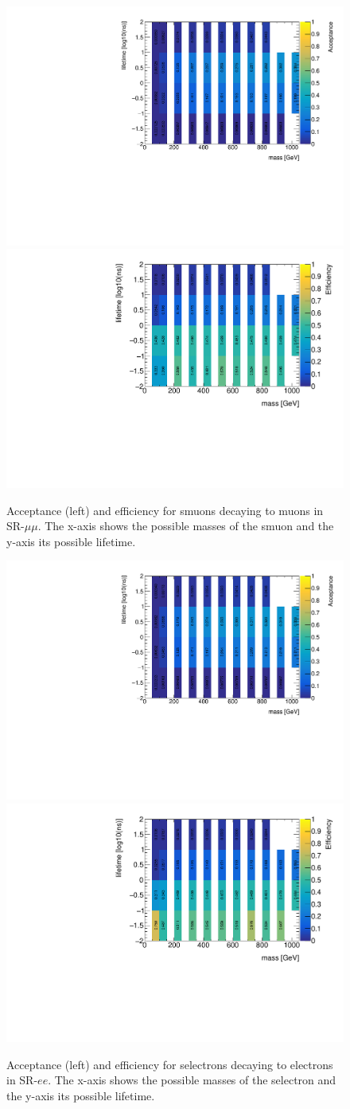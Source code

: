 \begin{figure}[htbp]
\centering
\includegraphics[width=.48\textwidth]{figures/event_selection/mm_slep_acc.pdf}
\includegraphics[width=.48\textwidth]{figures/event_selection/mm_slep_eff.pdf}
\caption{Acceptance (left) and efficiency for smuons decaying to muons in SR-$\mu\mu$. The x-axis shows the possible masses of the smuon and the y-axis its possible lifetime.}
\label{fig:acc-eff-mm}
\end{figure}

\begin{figure}[htbp]
\centering
\includegraphics[width=.48\textwidth]{figures/event_selection/ee_slep_acc.pdf}
\includegraphics[width=.48\textwidth]{figures/event_selection/ee_slep_eff.pdf}
\caption{Acceptance (left) and efficiency for selectrons decaying to electrons in SR-$ee$. The x-axis shows the possible masses of the selectron and the y-axis its possible lifetime.}
\label{fig:acc-eff-ee}
\end{figure}

